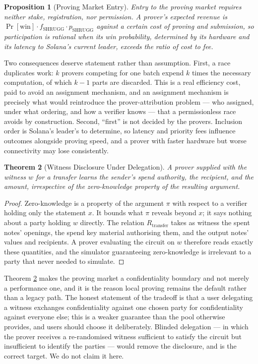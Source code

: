 \documentclass[11pt,a4paper]{article}
\newtheorem{theorem}{Theorem}[section]
\newtheorem{proposition}[theorem]{Proposition}
\begin{document}
\begin{proposition}[Proving Market Entry]
\label{prop:proventry}
Entry to the proving market requires neither stake, registration, nor permission. A prover's expected revenue is $\Pr[\text{win}] \cdot f_{\text{SHRUGG}} \cdot p_{\text{SHRUGG}}$ against a certain cost of proving and submission, so participation is rational when its win probability, determined by its hardware and its latency to Solana's current leader, exceeds the ratio of cost to fee.
\end{proposition}

Two consequences deserve statement rather than assumption. First, a race duplicates work: $k$ provers competing for one batch expend $k$ times the necessary computation, of which $k-1$ parts are discarded. This is a real efficiency cost, paid to avoid an assignment mechanism, and an assignment mechanism is precisely what would reintroduce the prover-attribution problem --- who assigned, under what ordering, and how a verifier knows --- that a permissionless race avoids by construction. Second, ``first'' is not decided by the provers. Inclusion order is Solana's leader's to determine, so latency and priority fees influence outcomes alongside proving speed, and a prover with faster hardware but worse connectivity may lose consistently.

\begin{theorem}[Witness Disclosure Under Delegation]
\label{thm:witness}
A prover supplied with the witness $w$ for a transfer learns the sender's spend authority, the recipient, and the amount, irrespective of the zero-knowledge property of the resulting argument.
\end{theorem}

\begin{proof}
Zero-knowledge is a property of the argument $\pi$ with respect to a verifier holding only the statement $x$. It bounds what $\pi$ reveals beyond $x$; it says nothing about a party holding $w$ directly. The relation $R_{\text{transfer}}$ takes as witness the spent notes' openings, the spend key material authorising them, and the output notes' values and recipients. A prover evaluating the circuit on $w$ therefore reads exactly these quantities, and the simulator guaranteeing zero-knowledge is irrelevant to a party that never needed to simulate.
\end{proof}

Theorem \ref{thm:witness} makes the proving market a confidentiality boundary and not merely a performance one, and it is the reason local proving remains the default rather than a legacy path. The honest statement of the tradeoff is that a user delegating a witness exchanges confidentiality against one chosen party for confidentiality against everyone else; this is a weaker guarantee than the pool otherwise provides, and users should choose it deliberately. Blinded delegation --- in which the prover receives a re-randomised witness sufficient to satisfy the circuit but insufficient to identify the parties --- would remove the disclosure, and is the correct target. We do not claim it here.
\end{document}
